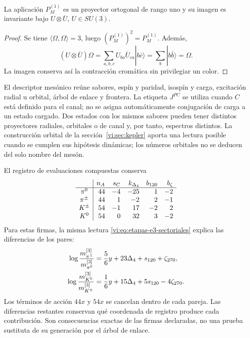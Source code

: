 \begin{proposition}
La aplicación \(P_M^{(1)}\) es un proyector ortogonal de rango uno y
su imagen es invariante bajo \(U\otimes\overline U\), \(U\in SU(3)\).
\end{proposition}
\begin{proof}
Se tiene \(\langle\Omega,\Omega\rangle=3\), luego
\((P_M^{(1)})^2=P_M^{(1)}\). Además,
\[
 (U\otimes\overline U)\Omega
 =\sum_{a,b,c}U_{ba}\overline U_{ca}|b\bar c\rangle
 =\sum_b|b\bar b\rangle=\Omega.
\]
La imagen conserva así la contracción cromática sin privilegiar un color.
\end{proof}

El descriptor mesónico reúne sabores, espín y paridad, isospín y carga,
excitación radial u orbital, árbol de enlace y frontera. La etiqueta
\(J^{PC}\) se utiliza cuando \(C\) está definido para el canal; no se
asigna automáticamente conjugación de carga a un estado cargado. Dos
estados con los mismos sabores pueden tener distintos proyectores
radiales, orbitales o de canal y, por tanto, espectros distintos. La
construcción orbital de la sección~\ref{vi:sec:kepler} aporta una
lectura posible cuando se cumplen sus hipótesis dinámicas; los números
orbitales no se deducen del solo nombre del mesón.

El registro de evaluaciones compuestas conserva
\[
\begin{array}{c|r r r r r}
 &n_A&s_C&k_{\Delta_4}&b_{120}&b_\zeta\\\hline
 \pi^0&44&-4&-25&1&-2\\
 \pi^\pm&44&1&-2&2&-1\\
 K^\pm&54&-1&17&-2&2\\
 K^0&54&0&32&3&-2
\end{array}
\]
Para estas firmas, la misma lectura \eqref{vi:eq:etapas-e3-sectoriales}
explica las diferencias de los pares:
\begin{align}
 \log\frac{m_{\pi^\pm}^{[3]}}{m_{\pi^0}^{[3]}}
 &=\frac56y+23\Delta_4+s_{120}+\zeta_{270},\notag\\
 \log\frac{m_{K^0}^{[3]}}{m_{K^\pm}^{[3]}}
 &=\frac16y+15\Delta_4+5s_{120}-4\zeta_{270}.
 \label{vi:eq:desdoblamientos-mesonicos}
\end{align}
Los términos de acción \(44x\) y \(54x\) se cancelan dentro de
cada pareja. Las diferencias restantes conservan qué coordenada de
registro produce cada contribución. Son consecuencias exactas de las
firmas declaradas, no una prueba sustituta de su generación por el árbol
de enlace.

